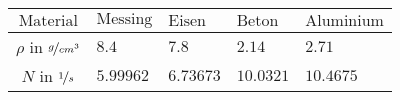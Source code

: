\begin{tabular}{c|*{4}{*{1}{l}}}
$\text{Material}$ & $\text{Messing}$ & $\text{Eisen}$ & $\text{Beton}$ & $\text{Aluminium}$ \\ \hline
$\rho$ in ${\nicefrac{g}{cm^3}}$ & $8.4$ & $7.8$ & $2.14$ & $2.71$ \\ \hline
$N$ in ${\nicefrac{1}{s}}$ & $5.99962$ & $6.73673$ & $10.0321$ & $10.4675$\end{tabular}
